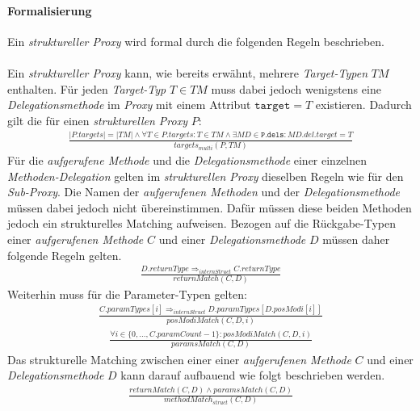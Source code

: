 \paragraph{Formalisierung}
Ein \emph{struktureller Proxy} wird formal durch die folgenden Regeln beschrieben.
\\\\
Ein \emph{struktureller Proxy} kann, wie bereits erwähnt, mehrere \emph{Target-Typen} $\mathit{TM}$ enthalten.
Für jeden \emph{Target-Typ} $T \in \mathit{TM}$ muss dabei jedoch wenigstens eine \emph{Delegationsmethode} im \emph{Proxy} mit einem Attribut $\texttt{target} = T$ existieren. Dadurch gilt die für einen \emph{strukturellen Proxy} $P$:
\begin{gather*}
\frac{|\mathit{P.targets}| = |\mathit{TM}| \wedge \forall \mathit{T} \in \mathit{P.targets}: T \in \mathit{TM} \wedge \exists \mathit{MD} \in \mathtt{P.dels}:\mathit{MD.del.target} = T}{\mathit{targets_{multi}(P, \mathit{TM})}}
\end{gather*}
\noindent
Für die \emph{aufgerufene Methode} und die \emph{Delegationsmethode} einer einzelnen \emph{Methoden-Delegation} gelten im \emph{strukturellen Proxy} dieselben Regeln wie für den \emph{Sub-Proxy}. Die Namen der \emph{aufgerufenen Methoden} und der \emph{Delegationsmethode} müssen dabei jedoch nicht übereinstimmen. Dafür müssen diese beiden Methoden jedoch ein strukturelles Matching aufweisen. Bezogen auf die Rückgabe-Typen einer \emph{aufgerufenen Methode} $\mathit{C}$ und einer \emph{Delegationsmethode} $\mathit{D}$ müssen daher folgende Regeln gelten.
\begin{gather*}
\frac{\mathit{D.returnType} \Rightarrow_{internStruct} \mathit{C.returnType}}{\mathit{returnMatch(C,D)}}
\end{gather*} 
\noindent
Weiterhin muss für die Parameter-Typen gelten:
\begin{gather*}
\frac{
\mathit{C.paramTypes}[i] \Rightarrow_{internStruct} \mathit{D.paramTypes}[\mathit{D.posModi}[i]]}{\mathit{posModiMatch(C,D,i)}}
\end{gather*} 
\begin{gather*}
\frac{\forall \mathit{i} \in \{0,...,\mathit{C.paramCount}-1\}: \mathit{posModiMatch(C,D,i)}
}{\mathit{paramsMatch(C,D)}}
\end{gather*} 
\noindent
Das strukturelle Matching zwischen einer einer \emph{aufgerufenen Methode} $C$ und einer \emph{Delegationsmethode} $D$ kann darauf aufbauend wie folgt beschrieben werden.
\begin{gather*}
\frac{\mathit{returnMatch(C,D) \wedge \mathit{paramsMatch(C,D)}}}
{\mathit{methodMatch_{struct}(C,D)}}
\end{gather*}
